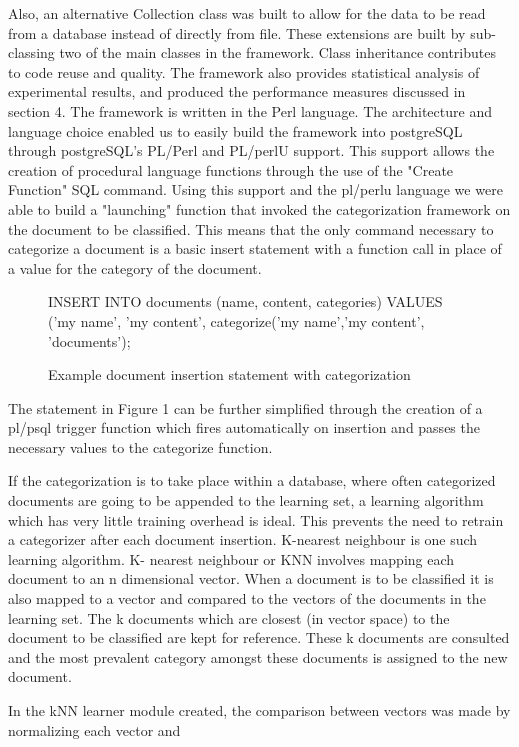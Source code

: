 \documentclass[twocolumn]{article}
\begin{document}
Also, an alternative Collection class was built to allow for the data to be read from a 
database instead of directly from file. These extensions are built by sub-classing two 
of the main classes in the framework. Class inheritance contributes to code reuse and 
quality. The framework also provides statistical analysis of experimental results, and 
produced the performance measures discussed in section 4. The framework is written 
in the Perl language. The architecture and language choice enabled us to easily build the 
framework into postgreSQL through postgreSQL's PL/Perl and PL/perlU support. 
This support allows the creation of procedural language functions through the use of 
the "Create Function" SQL command. Using this support and the pl/perlu language 
we were able to build a "launching" function that invoked the categorization 
framework on the document to be classified. This means that the only command 
necessary to categorize a document is a basic insert statement with a function call in 
place of a value for the category of the document.

\begin{figure}
 INSERT INTO documents (name, content, categories) 
 VALUES ('my name', 'my content', categorize('my name','my content', 'documents');
\caption{Example document insertion statement with categorization}
\end{figure}

The statement in Figure 1 can be further simplified through the creation of a pl/psql 
trigger function which fires automatically on insertion and passes the necessary values 
to the categorize function. 

If the categorization is to take place within a database, where often categorized 
documents are going to be appended to the learning set, a learning algorithm which has 
very little training overhead is ideal. This prevents the need to retrain a categorizer 
after each document insertion. K-nearest neighbour is one such learning algorithm. K-
nearest neighbour or KNN involves mapping each document to an n dimensional 
vector. When a document is to be classified it is also mapped to a vector and 
compared to the vectors of the documents in the learning set. The k documents which 
are closest (in vector space) to the document to be classified are kept for reference. 
These k documents are consulted and the most prevalent category amongst these 
documents is assigned to the new document. 

In the kNN learner module created, the comparison between vectors was made by 
normalizing each vector and 
\end{document}
